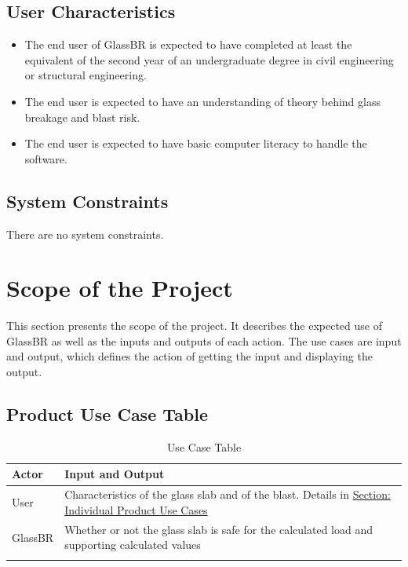 \documentclass[12pt]{article}
\begin{document}
\subsection{User Characteristics}
\label{Sec:UserChars}
\begin{itemize}
\item{The end user of GlassBR is expected to have completed at least the equivalent of the second year of an undergraduate degree in civil engineering or structural engineering.}
\item{The end user is expected to have an understanding of theory behind glass breakage and blast risk.}
\item{The end user is expected to have basic computer literacy to handle the software.}
\end{itemize}
\subsection{System Constraints}
\label{Sec:SysConstraints}
There are no system constraints.
\section{Scope of the Project}
\label{Sec:ProjScope}
This section presents the scope of the project. It describes the expected use of GlassBR as well as the inputs and outputs of each action. The use cases are input and output, which defines the action of getting the input and displaying the output.
\subsection{Product Use Case Table}
\label{Sec:UseCaseTable}
\begin{longtabu}{l X[l]}
\toprule
Actor & Input and Output
\\
\midrule
User & Characteristics of the glass slab and of the blast. Details in \hyperref[Sec:IndividualProdUC]{Section: Individual Product Use Cases}
\\
GlassBR & Whether or not the glass slab is safe for the calculated load and supporting calculated values
\\
\bottomrule
\caption{Use Case Table}
\label{Table:useCaseTable}
\end{longtabu}
\end{document}
